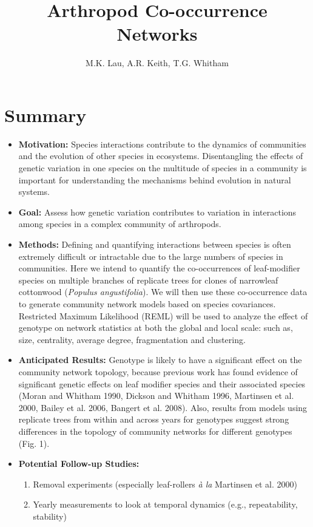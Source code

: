 \documentclass[11pt]{amsart}
\title{Arthropod Co-occurrence Networks}
\author{M.K. Lau, A.R. Keith, T.G. Whitham}
\begin{document}
\maketitle
\section{Summary}
\begin{itemize}
\item \textbf{Motivation:} Species interactions contribute to the dynamics of communities and the evolution of other species in ecosystems. Disentangling the effects of genetic variation in one species on the multitude of species in a community is important for understanding the mechanisms behind evolution in natural systems.
\item \textbf{Goal:} Assess how genetic variation contributes to variation in interactions among species in a complex community of arthropods.
\item \textbf{Methods:} Defining and quantifying interactions between species is often extremely difficult or intractable due to the large numbers of species in communities. Here we intend to quantify the co-occurrences of leaf-modifier species on multiple branches of replicate trees for clones of narrowleaf cottonwood (\textit{Populus angustifolia}). We will then use these co-occurrence data to generate community network models based on species covariances. Restricted Maximum Likelihood (REML) will be used to analyze the effect of genotype on network statistics at both the global and local scale: such as, size, centrality, average degree, fragmentation and clustering. 
\item \textbf{Anticipated Results:} Genotype is likely to have a significant effect on the community network topology, because previous work has found evidence of significant genetic effects on leaf modifier species and their associated species (Moran and Whitham 1990, Dickson and Whitham 1996, Martinsen et al. 2000, Bailey et al. 2006, Bangert et al. 2008). Also, results from models using replicate trees from within and across years for genotypes suggest strong differences in the topology of community networks for different genotypes (Fig. 1).
\item \textbf{Potential Follow-up Studies:} 
	\begin{enumerate}
	\item Removal experiments (especially leaf-rollers \textit{\`{a} la} Martinsen et al. 2000)
	\item Yearly measurements to look at temporal dynamics (e.g., repeatability, stability)
	\end{enumerate}
\end{itemize}
\end{document}
